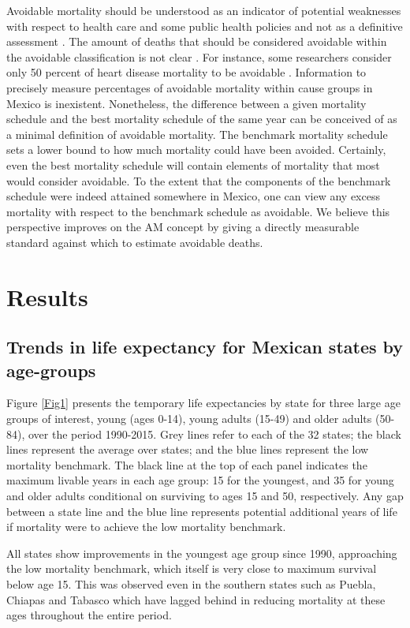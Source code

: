 \documentclass{bmcart}
\begin{document}
Avoidable mortality should be understood as an indicator of potential
weaknesses with respect to health care and some public health policies and not
as a definitive assessment \cite{nolte&mckee2008}. The amount of deaths that should be considered avoidable within the avoidable classification is not clear \cite{beltran2011avoidable}. For instance, some researchers consider only 50 percent of heart disease mortality to be avoidable \cite{nolte2012amenable, holland2003}. Information to precisely
measure percentages of avoidable mortality within cause groups in Mexico is inexistent. Nonetheless, the
difference between a given mortality schedule and the best mortality schedule of
the same year can be conceived of as a minimal definition of avoidable
mortality. The benchmark mortality schedule sets a lower bound to how much mortality could have been avoided. Certainly, even the best mortality schedule will contain elements of mortality that
most would consider avoidable. To the extent that the components of the benchmark schedule were indeed
attained somewhere in Mexico, one can view any excess mortality
with respect to the benchmark schedule as avoidable. We believe this perspective improves on the AM concept by giving a directly measurable standard against which to estimate avoidable deaths.

\section*{Results}

\subsection*{Trends in life expectancy for Mexican states by age-groups}

Figure \ref{Fig1} presents the temporary life expectancies by state for three large age groups of interest, young (ages 0-14), young
adults (15-49) and older adults (50-84), over the period 1990-2015. Grey lines
refer to each of the 32 states; the black lines represent the average over
states; and the blue lines represent the low mortality benchmark. The black line
at the top of each panel indicates the maximum livable years in each age group: 15 for the youngest, and 35 for young and older adults conditional on surviving to ages 15 and 50, respectively. Any gap between a state line and the blue line represents potential additional years of life if mortality were to achieve the low mortality benchmark.

All states show improvements in the youngest age group since 1990, approaching the low mortality benchmark, which itself is very close to maximum survival below age 15. This was observed even in the southern states such as Puebla, Chiapas and Tabasco which have lagged behind in reducing mortality at these ages throughout the entire period. 	
\end{document}
